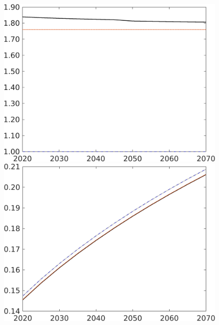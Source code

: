 \begin{figure}[h!!]
\begin{minipage}[]{0.32\textwidth}
		\includegraphics[width=1\textwidth]{../../codding_model/own_basedOnFried/optimalPol_190722_tidiedUp/figures/all_10Aout22/CountNskTaulLF_target_whwl_spillover0_sep1_extern0_PV1_etaa0.79_lgd0.png}
	\end{minipage}
	\begin{minipage}[]{0.32\textwidth}
		\includegraphics[width=1\textwidth]{../../codding_model/own_basedOnFried/optimalPol_190722_tidiedUp/figures/all_10Aout22/CountNskTaulLF_target_GFF_spillover0_sep1_extern0_PV1_etaa0.79_lgd0.png}

\end{minipage}
\end{figure}
